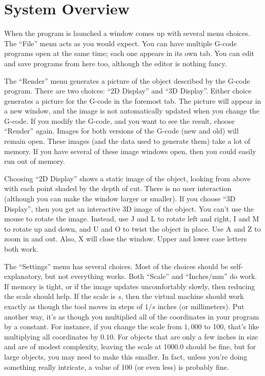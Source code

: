 \documentclass[titlepage,oneside,10pt]{article}
\begin{document}
\raggedbottom

\newcommand{\mymargin}[1]{\marginpar{\rm\tiny #1}}
\newcommand{\leftmar}[1]{\reversemarginpar \mymargin{#1}}

\section{System Overview}

When the program is launched a window comes up with several menu
choices. The ``File'' menu acts as you would expect. You can have
multiple G-code programs open at the same time; each one appears in
its own tab. You can edit and save programs from here too, although
the editor is nothing fancy.

The ``Render'' menu generates a picture of the object described by
the G-code program. There are two choices: ``2D Display'' and ``3D
Display''. Either choice generates a picture for the G-code in 
the foremost tab. The picture will appear in a new window, and 
the image is not automatically updated when you change the
G-code. If you modify the G-code, and you want to see the result,
choose ``Render'' again. Images for both versions of the G-code (new
and old) will remain open. These images (and the data used to generate
them) take a lot of memory. If you have several of these image windows
open, then you could easily run out of memory.

Choosing ``2D Display'' shows a static image of the object, looking
from above with each point shaded by the depth of cut. There is no
user interaction (although you can make the window larger or
smaller). If you choose ``3D Display'', then you get an interactive
3D image of the object. You can't use the mouse to rotate the
image. Instead, use J and L to rotate left and right, I and M to
rotate up and down, and U and O to twist the object in place. Use A
and Z to zoom in and out. Also, X will close the window. Upper and
lower case letters both work.

The ``Settings'' menu has several choices. Most of the choices should
be self-explanatory, but not everything works. Both ``Scale'' and
``Inches/mm'' do work. If memory is tight, or if the
image updates uncomfortably slowly, then reducing the scale
should help. If the scale is $s$, then the virtual machine should work
exactly as though the tool moves in steps of $1/s$ inches (or
millimeters). Put another way, it's as though you multiplied all of
the coordinates in your program by a constant. For instance, if you
change the scale from $1,000$ to 100, that's like multiplying all
coordinates by $0.10$. For objects that are only a few inches in size and are
of modest complexity, leaving the scale at 1000.0 should be fine, but
for large objects, you may need to make this smaller. In fact, unless you're
doing something really intricate, a value of 100 (or even less) is
probably fine. 
\end{document}
